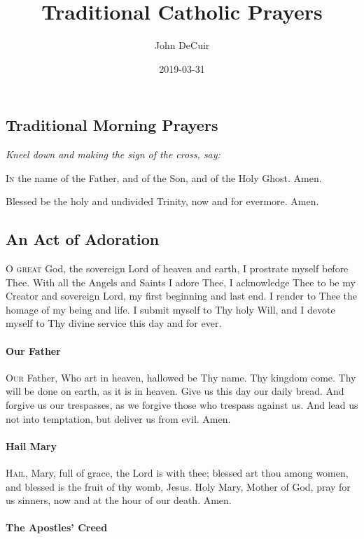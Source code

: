 \documentclass{article}
\title{Traditional Catholic Prayers}
\date{2019-03-31}
\author{John DeCuir}
\begin{document}
\begin{multicols}{3}

\section*{Traditional Morning Prayers}

\textit{Kneel down and making the sign of the cross, say:}

\textsc{In} the name of the Father, and of the Son, and of the Holy Ghost.
Amen.

Blessed be the holy and undivided Trinity, now and for evermore.
Amen.

\subsection*{An Act of Adoration}

\textsc{O great} God, the sovereign Lord of heaven and earth, I prostrate
myself before Thee.  With all the Angels and Saints I adore
Thee, I acknowledge Thee to be my Creator and sovereign Lord,
my first beginning and last end.  I render to Thee the homage
of my being and life.  I submit myself to Thy holy Will,
and I devote myself to Thy divine service this day and for
ever.

\paragraph{Our Father}

\textsc{Our} Father, Who art in heaven, hallowed be Thy name.
Thy kingdom come.  Thy will be done on earth, as it is in heaven.
Give us this day our daily bread.  And forgive us our trespasses,
as we forgive those who trespass against us.  And lead us not
into temptation, but deliver us from evil.  Amen.

\paragraph{Hail Mary}

\textsc{Hail}, Mary, full of grace, the Lord is with thee;
blessed art thou among women, and blessed is the fruit of
thy womb, Jesus.  Holy Mary, Mother of God, pray for us sinners,
now and at the hour of our death. Amen.

\paragraph{The Apostles' Creed}


\end{multicols}
\end{document}
